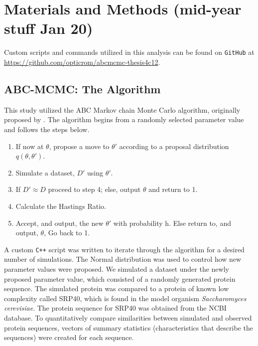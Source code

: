 \documentclass{article}
\newcommand{\sclong}{\textit{Saccharomyces cerevisiae}\xspace}
\begin{document}

\section{Materials and Methods (mid-year stuff Jan 20)} 
\label{methods}
Custom scripts and commands utilized in this analysis can be found on \texttt{GitHub} at
\url{https://github.com/opticrom/abcmcmc-thesis4c12}.


\subsection{ABC-MCMC: The Algorithm}

This study utilized the ABC Markov chain Monte Carlo algorithm, originally proposed by \citet{marjoram2003markov}. The algorithm begins from a randomly selected parameter value and follows the steps below.

	\begin{enumerate}
		\item If now at $\theta$, propose a move to $\theta'$ according to a proposal distribution $q(\theta, \theta')$.
		\item Simulate a dataset, $D'$ using $\theta'$.
		\item If $D' \approx D$ proceed to step 4; else, output $\theta$ and return to 1.
		\item Calculate the Hastings Ratio.
		\item Accept, and output, the new $\theta'$ with probability h. Else return to, and output, $\theta$, Go back to 1.
	\end{enumerate}

A custom \texttt{C++} script was written to iterate through the algorithm for a desired number of simulations. The Normal distribution was used to control how new parameter values were proposed. We simulated a dataset under the newly proposed parameter value, which consisted of a randomly generated protein sequence. The simulated protein was compared to a protein of known low complexity called SRP40, which is found in the model organism \sclong. The protein sequence for SRP40 was obtained from the NCBI database. To quantitatively compare similarities between simulated and observed protein sequences, vectors of summary statistics (characteristics that describe the sequences) were created for each sequence. 
\end{document}
